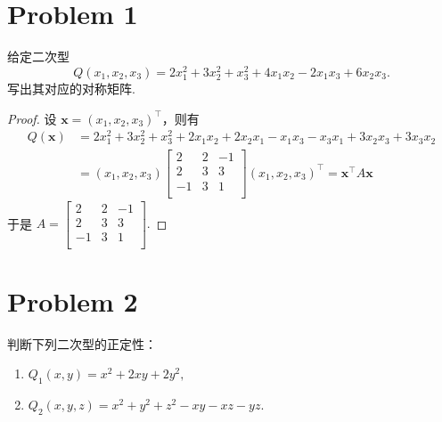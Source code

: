 \section*{Problem 1}

给定二次型
\[
Q \left(x_1, x_2, x_3\right) = 2x_1^2 + 3x_2^2 + x_3^2 + 4x_1x_2 - 2x_1x_3 + 6x_2x_3.
\]
写出其对应的对称矩阵.

\begin{proof}

设 $\boldsymbol{x} = \left(x_1, x_2, x_3\right)^\top$，则有
\[
\begin{aligned}
Q \left(\boldsymbol{x}\right) &= 2 x_1^2 + 3 x_2^2 + x_3^2 + 2 x_1x_2 + 2 x_2x_1 - x_1x_3 - x_3x_1 + 3x_2x_3 + 3x_3x_2 \\
&= \left(x_1, x_2, x_3\right) \begin{bmatrix}
    2 & 2 & -1 \\
    2 & 3 & 3 \\
    -1 & 3 & 1 \\
\end{bmatrix} \left(x_1, x_2, x_3\right)^\top = \boldsymbol{x}^\top A \boldsymbol{x}
\end{aligned}
\]
于是 $\boxed{A = \begin{bmatrix}
    2 & 2 & -1 \\
    2 & 3 & 3 \\
    -1 & 3 & 1 \\
\end{bmatrix}}.$

\end{proof}

\section*{Problem 2}

判断下列二次型的正定性：

\begin{enumerate}[]
    \item $Q_1 \left(x, y\right) = x^2 + 2xy + 2y^2, $
    \item $Q_2 \left(x, y, z\right) = x^2 + y^2 + z^2 - xy - xz - yz.$
\end{enumerate}

